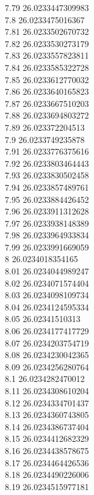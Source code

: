 {7.79	26.0233447309983\\
7.8	26.0233475016367\\
7.81	26.0233502670732\\
7.82	26.0233530273179\\
7.83	26.0233557823811\\
7.84	26.0233585322728\\
7.85	26.0233612770032\\
7.86	26.0233640165823\\
7.87	26.0233667510203\\
7.88	26.0233694803272\\
7.89	26.023372204513\\
7.9	26.0233749235878\\
7.91	26.0233776375616\\
7.92	26.0233803464443\\
7.93	26.0233830502458\\
7.94	26.0233857489761\\
7.95	26.0233884426452\\
7.96	26.0233911312628\\
7.97	26.0233938148389\\
7.98	26.0233964933834\\
7.99	26.0233991669059\\
8	26.0234018354165\\
8.01	26.0234044989247\\
8.02	26.0234071574404\\
8.03	26.0234098109734\\
8.04	26.0234124595334\\
8.05	26.02341510313\\
8.06	26.0234177417729\\
8.07	26.0234203754719\\
8.08	26.0234230042365\\
8.09	26.0234256280764\\
8.1	26.0234282470012\\
8.11	26.0234308610204\\
8.12	26.0234334701437\\
8.13	26.0234360743805\\
8.14	26.0234386737404\\
8.15	26.0234412682329\\
8.16	26.0234438578675\\
8.17	26.0234464426536\\
8.18	26.0234490226006\\
8.19	26.0234515977181\\
}
